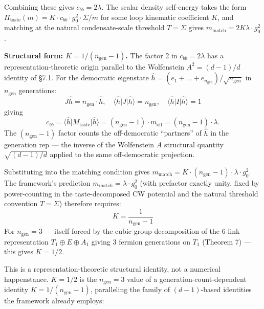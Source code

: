 \documentclass[
]{article}
\begin{document}
Combining these gives \(c_{bb} = 2\lambda\). The scalar density
self-energy takes the form
\(\Pi_{\text{taste}}(m) = K \cdot c_{bb} \cdot g_0^2 \cdot \Sigma/m\)
for some loop kinematic coefficient \(K\), and matching at the natural
condensate-scale threshold \(T = \Sigma\) gives
\(m_{\text{match}} = 2K \lambda \cdot g_0^2\).

\textbf{Structural form: \(K = 1/(n_{\text{gen}} - 1)\).} The factor 2
in \(c_{bb} = 2\lambda\) has a representation-theoretic origin parallel
to the Wolfenstein \(A^2 = (d-1)/d\) identity of §7.1. For the
democratic eigenstate
\(\hat h = (e_1 + \ldots + e_{n_{\text{gen}}})/\sqrt{n_{\text{gen}}}\)
in \(n_{\text{gen}}\) generations:
\[J\hat h = n_{\text{gen}} \cdot \hat h, \quad \langle \hat h | J | \hat h \rangle = n_{\text{gen}}, \quad \langle \hat h | I | \hat h \rangle = 1\]
giving
\[c_{bb} = \langle \hat h | M_{\text{taste}} | \hat h \rangle = (n_{\text{gen}} - 1) \cdot m_{\text{off}} = (n_{\text{gen}} - 1) \cdot \lambda.\]
The \((n_{\text{gen}} - 1)\) factor counts the off-democratic
``partners'' of \(\hat h\) in the generation rep --- the inverse of the
Wolfenstein \(A\) structural quantity \(\sqrt{(d-1)/d}\) applied to the
same off-democratic projection.

Substituting into the matching condition gives
\(m_{\text{match}} = K \cdot (n_{\text{gen}} - 1) \cdot \lambda \cdot g_0^2\).
The framework's prediction \(m_{\text{match}} = \lambda \cdot g_0^2\)
(with prefactor exactly unity, fixed by power-counting in the
taste-decomposed CW potential and the natural threshold convention
\(T = \Sigma\)) therefore requires:
\[\boxed{K = \frac{1}{n_{\text{gen}} - 1}}\] For \(n_{\text{gen}} = 3\)
--- itself forced by the cubic-group decomposition of the 6-link
representation \(T_1 \oplus E \oplus A_1\) giving 3 fermion generations
on \(T_1\) (Theorem 7) --- this gives \(K = 1/2\).

This is a representation-theoretic structural identity, not a numerical
happenstance. \(K = 1/2\) is the \(n_{\text{gen}} = 3\) value of a
generation-count-dependent identity \(K = 1/(n_{\text{gen}} - 1)\),
paralleling the family of \((d-1)\)-based identities the framework
already employs:
\end{document}
